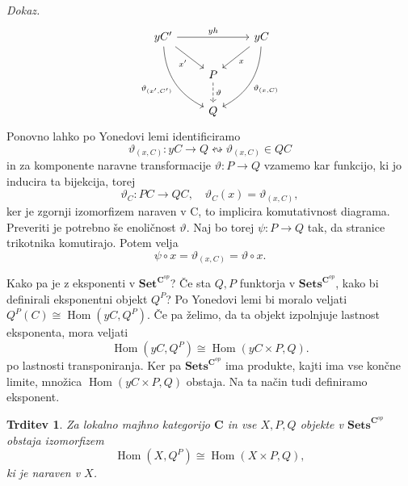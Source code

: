 \documentclass[12pt,a4paper]{book}
\theoremstyle{definition}
\theoremstyle{plain}
\newtheorem{trditev}[definicija]{Trditev}
\newenvironment{dokaz}{\emph{Dokaz.}\ }{\hspace{\fill}{$\Box$}}
\theoremstyle{definition}
\theoremstyle{remark}
\newcommand{\cat}[1]{\textbf{#1}}
\DeclareMathOperator{\Hom}{Hom}
\newcommand{\predsnop}[1]{\cat{Sets}^{\cat{#1}^{op}}}
\begin{document}
\begin{dokaz}
%
$$\begin{tikzcd}
yC' \ar[rr, "yh"] \ar[ddr, bend right, "\vartheta_{(x',C')}"'] \ar[rd, "x'"'] & & yC \ar[ld, "x"] \ar[ddl, bend left, "\vartheta_{(x,C)}"] \\
& P \ar[d, dashed, "\vartheta"] & \\
& Q &
\end{tikzcd} $$
Ponovno lahko po Yonedovi lemi identificiramo 
$$\vartheta_{(x,C)}: yC \to Q \leftrightsquigarrow \vartheta_{(x,C)} \in QC$$
in za komponente naravne transformacije $\vartheta : P \to Q$ vzamemo kar funkcijo, ki jo inducira ta bijekcija, torej 
$$\vartheta_C : PC \to QC, \quad \vartheta_C(x) = \vartheta_{(x,C)},$$
ker je zgornji izomorfizem naraven v C, to implicira komutativnost diagrama. Preveriti je potrebno še enoličnost $\vartheta$. Naj bo torej $\psi : P \to Q$ tak, da stranice trikotnika komutirajo. Potem velja 
$$\psi \circ x = \vartheta_{(x,C)} = \vartheta \circ x.$$
\end{dokaz}

Kako pa je z eksponenti v $\cat{Set}^{\cat{C}^{op}}$? Če sta $Q,P$ funktorja v $\predsnop{C}$, kako bi definirali eksponentni objekt $Q^P$? Po Yonedovi lemi bi moralo veljati $Q^P(C) \cong \Hom(yC, Q^P)$. Če pa želimo, da ta objekt izpolnjuje lastnost eksponenta, mora veljati
\begin{equation} \label{eq eksp}
\Hom(yC,Q^P) \cong \Hom(yC \times P, Q).
\end{equation}
po lastnosti transponiranja. Ker pa $\predsnop{C}$ ima produkte, kajti ima vse končne limite, množica $\Hom(yC \times P, Q)$ obstaja. Na ta način tudi definiramo eksponent.

\begin{trditev} \label{trditev 3.6}
Za lokalno majhno kategorijo $\cat{C}$ in vse $X,P,Q$ objekte v $\predsnop{C}$ obstaja izomorfizem
$$\Hom(X,Q^P) \cong \Hom(X \times P, Q),$$
ki je naraven v $X$.
\end{trditev}
\end{document}
